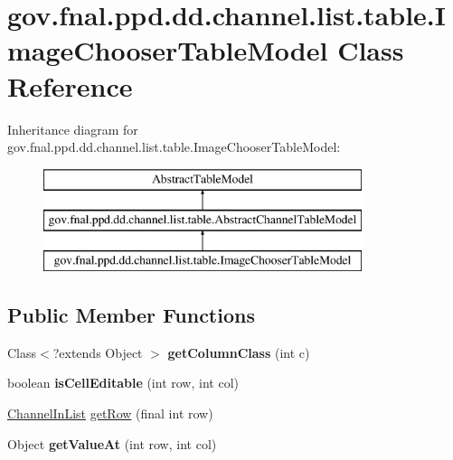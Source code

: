 \hypertarget{classgov_1_1fnal_1_1ppd_1_1dd_1_1channel_1_1list_1_1table_1_1ImageChooserTableModel}{\section{gov.\-fnal.\-ppd.\-dd.\-channel.\-list.\-table.\-Image\-Chooser\-Table\-Model Class Reference}
\label{classgov_1_1fnal_1_1ppd_1_1dd_1_1channel_1_1list_1_1table_1_1ImageChooserTableModel}
}
Inheritance diagram for gov.\-fnal.\-ppd.\-dd.\-channel.\-list.\-table.\-Image\-Chooser\-Table\-Model\-:\begin{figure}[H]
\begin{center}
\leavevmode
\includegraphics[height=3.000000cm]{classgov_1_1fnal_1_1ppd_1_1dd_1_1channel_1_1list_1_1table_1_1ImageChooserTableModel}
\end{center}
\end{figure}
\subsection*{Public Member Functions}
\begin{DoxyCompactItemize}
\item 
\hypertarget{classgov_1_1fnal_1_1ppd_1_1dd_1_1channel_1_1list_1_1table_1_1ImageChooserTableModel_a8b7164eb617a21eb497f184c3acd1950}{Class$<$?extends Object $>$ {\bfseries get\-Column\-Class} (int c)}\label{classgov_1_1fnal_1_1ppd_1_1dd_1_1channel_1_1list_1_1table_1_1ImageChooserTableModel_a8b7164eb617a21eb497f184c3acd1950}

\item 
\hypertarget{classgov_1_1fnal_1_1ppd_1_1dd_1_1channel_1_1list_1_1table_1_1ImageChooserTableModel_ac9c6c92a598cb666edd2e6bc572a0c72}{boolean {\bfseries is\-Cell\-Editable} (int row, int col)}\label{classgov_1_1fnal_1_1ppd_1_1dd_1_1channel_1_1list_1_1table_1_1ImageChooserTableModel_ac9c6c92a598cb666edd2e6bc572a0c72}

\item 
\hyperlink{classgov_1_1fnal_1_1ppd_1_1dd_1_1channel_1_1ChannelInList}{Channel\-In\-List} \hyperlink{classgov_1_1fnal_1_1ppd_1_1dd_1_1channel_1_1list_1_1table_1_1ImageChooserTableModel_a00da5535ef51a9e172a596176dfbc48e}{get\-Row} (final int row)
\item 
\hypertarget{classgov_1_1fnal_1_1ppd_1_1dd_1_1channel_1_1list_1_1table_1_1ImageChooserTableModel_a4cc66bad16ee719c0162a2497820b0ab}{Object {\bfseries get\-Value\-At} (int row, int col)}\label{classgov_1_1fnal_1_1ppd_1_1dd_1_1channel_1_1list_1_1table_1_1ImageChooserTableModel_a4cc66bad16ee719c0162a2497820b0ab}

\end{DoxyCompactItemize}
